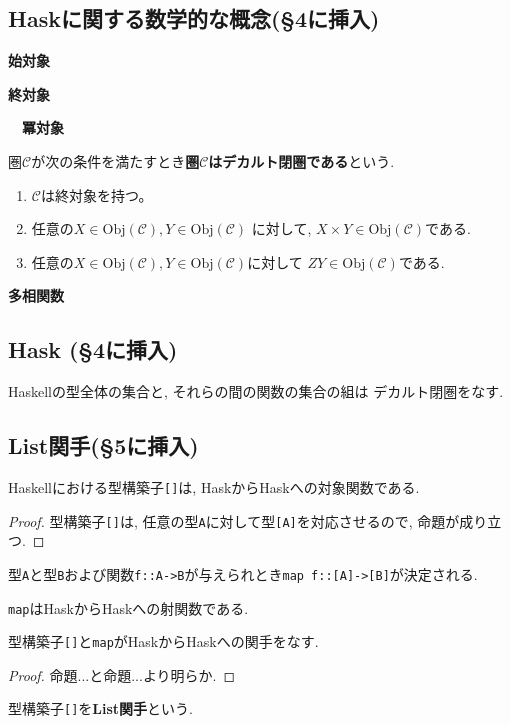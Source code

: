 \subsection{Haskに関する数学的な概念(\S 4に挿入)}
\begin{Def}
{\bf 始対象}
\end{Def}
\begin{Def}
{\bf 終対象}
\end{Def}
\begin{Def}
{\bf　冪対象}
\end{Def}
\begin{Def}
圏$\mathscr{C}$が次の条件を満たすとき{\bf 圏$\mathscr{C}$はデカルト閉圏である}という.
\begin{enumerate}
\item
$\mathscr{C}$は終対象を持つ。
\item
任意の$X\in\mathrm{Obj}(\mathscr{C}),Y\in\mathrm{Obj}(\mathscr{C})$ に対して,
$X\times Y\in\mathrm{Obj}(\mathscr{C})$である.
\item
任意の$X\in\mathrm{Obj}(\mathscr{C}),Y\in\mathrm{Obj}(\mathscr{C})$に対して
$ZY\in\mathrm{Obj}(\mathscr{C})$である.
\end{enumerate}
\end{Def}
\begin{Def}
{\bf 多相関数}
\end{Def}
\subsection{Hask (\S 4に挿入)}

\begin{Prop}
Haskellの型全体の集合と,
それらの間の関数の集合の組は
デカルト閉圏をなす.
\end{Prop}


\subsection{List関手(\S 5に挿入)}



\begin{Prop}
Haskellにおける型構築子\verb|[]|は, HaskからHaskへの対象関数である.
\end{Prop}
\begin{proof}
型構築子\verb|[]|は, 任意の型\verb|A|に対して型\verb|[A]|を対応させるので, 命題が成り立つ.
\end{proof}

型\verb|A|と型\verb|B|および関数\verb|f::A->B|が与えられとき\verb|map f::[A]->[B]|が決定される.
\begin{Prop}
\verb|map|はHaskからHaskへの射関数である.
\end{Prop}
\begin{Prop}
型構築子\verb|[]|と\verb|map|がHaskからHaskへの関手をなす.
\end{Prop}
\begin{proof}
命題...と命題...より明らか.
\end{proof}
型構築子\verb|[]|を{\bf List関手}という.
